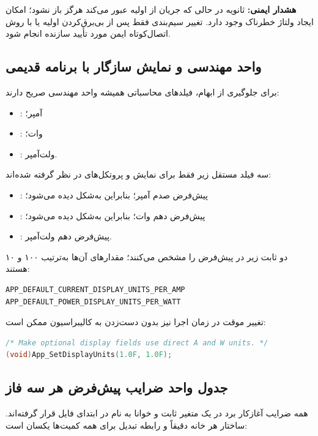\textbf{هشدار ایمنی:} ثانویه  در حالی که جریان از اولیه عبور می‌کند هرگز باز نشود؛ امکان ایجاد ولتاژ خطرناک وجود دارد. تغییر سیم‌بندی فقط پس از بی‌برق‌کردن اولیه یا با روش اتصال‌کوتاه ایمن مورد تأیید سازنده انجام شود.

\subsection{واحد مهندسی و نمایش سازگار با برنامه قدیمی}
برای جلوگیری از ابهام، فیلدهای محاسباتی همیشه واحد مهندسی صریح دارند:

\begin{itemize}
  \item {}: آمپر؛
  \item {}: وات؛
  \item {}: ولت‌آمپر.
\end{itemize}

سه فیلد مستقل زیر فقط برای نمایش و پروتکل‌های  در نظر گرفته شده‌اند:

\begin{itemize}
  \item {}: پیش‌فرض صدم آمپر؛ بنابراین  به‌شکل  دیده می‌شود؛
  \item {}: پیش‌فرض دهم وات؛ بنابراین  به‌شکل  دیده می‌شود؛
  \item {}: پیش‌فرض دهم ولت‌آمپر.
\end{itemize}

دو ثابت زیر در  پیش‌فرض را مشخص می‌کنند؛ مقدارهای آن‌ها به‌ترتیب ۱۰۰ و ۱۰ هستند:

\begin{LTR}
\begin{lstlisting}
APP_DEFAULT_CURRENT_DISPLAY_UNITS_PER_AMP
APP_DEFAULT_POWER_DISPLAY_UNITS_PER_WATT
\end{lstlisting}
\end{LTR}

تغییر موقت در زمان اجرا نیز بدون دست‌زدن به کالیبراسیون ممکن است:

\begin{LTR}
\begin{lstlisting}[language=C]
/* Make optional display fields use direct A and W units. */
(void)App_SetDisplayUnits(1.0F, 1.0F);
\end{lstlisting}
\end{LTR}

\subsection{جدول واحد ضرایب پیش‌فرض هر سه فاز}
همه ضرایب آغازکار برد در یک متغیر ثابت و خوانا به نام
در ابتدای فایل 
قرار گرفته‌اند. ساختار هر خانه دقیقاً
و رابطه تبدیل برای همه کمیت‌ها یکسان است:

